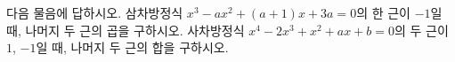 다음 물음에 답하시오.
 삼차방정식 $x^3-ax^2+(a+1)x+3a=0$의 한 근이 $-1$일 때, 나머지 두 근의 곱을 구하시오. 
 사차방정식 $x^4-2x^3+x^2+ax+b=0$의 두 근이 $1$, $-1$일 때, 나머지 두 근의 합을 구하시오. 
